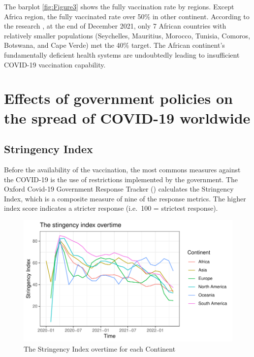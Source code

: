 \documentclass[11pt,a4paper,]{article}
\begin{document}
The barplot \ref{fig:Figure3} shows the fully vaccination rate by regions. Except Africa region, the fully vaccinated rate over 50\% in other continent. According to the research \textcite{African-COVID-19-vaccination}, at the end of December 2021, only 7 African countries with relatively smaller populations (Seychelles, Mauritius, Morocco, Tunisia, Comoros, Botswana, and Cape Verde) met the 40\% target. The African continent's fundamentally deficient health systems are undoubtedly leading to insufficient COVID-19 vaccination capability.

\clearpage

\section*{Effects of government policies on the spread of COVID-19 worldwide}

\subsection*{Stringency Index}

Before the availability of the vaccination, the most commons measures against the COVID-19 is the use of restrictions implemented by the government. The Oxford Covid-19 Government Response Tracker (\textcite{OxCGRT}) calculates the Stringency Index, which is a composite measure of nine of the response metrics. The higher index score indicates a stricter response (i.e.~100 = strictest response).

\begin{figure}

{\centering \includegraphics{report_files/figure-latex/stringency-index-1} 

}

\caption{The Stringency Index overtime for each Continent}\label{fig:stringency-index}
\end{figure}
\end{document}
